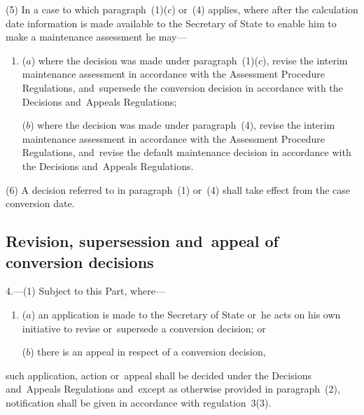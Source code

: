 \documentclass[12pt,a4paper]{article}
\begin{document}
(5) In a case to which paragraph~(1)($c$)  or~(4) applies, where after the calculation date information is made available to the Secretary of State to enable him to make a maintenance assessment he may—
\begin{enumerate}\item[]
($a$) where the decision was made under paragraph~(1)($c$), revise the interim maintenance assessment in accordance with the Assessment Procedure Regulations, and~supersede the conversion decision in accordance with the Decisions and~Appeals Regulations;

($b$) where the decision was made under paragraph~(4), revise the interim maintenance assessment in accordance with the Assessment Procedure Regulations, and~revise the default maintenance decision in accordance with the Decisions and~Appeals Regulations.
\end{enumerate}

(6) A decision referred to in paragraph~(1) or~(4) shall take effect from the case conversion date.


\subsection[4. Revision, supersession and~appeal of conversion decisions]{Revision, supersession and~appeal of conversion decisions}

4.---(1)  Subject to this Part, where—
\begin{enumerate}\item[]
($a$) an application is made to the Secretary of State or~he acts on his own initiative to revise or~supersede a conversion decision; or

($b$) there is an appeal in respect of a conversion decision,
\end{enumerate}
such application, action or~appeal shall be decided under the Decisions and~Appeals Regulations and~except as otherwise provided in paragraph~(2), notification shall be given in accordance with regulation~3(3).
\end{document}
